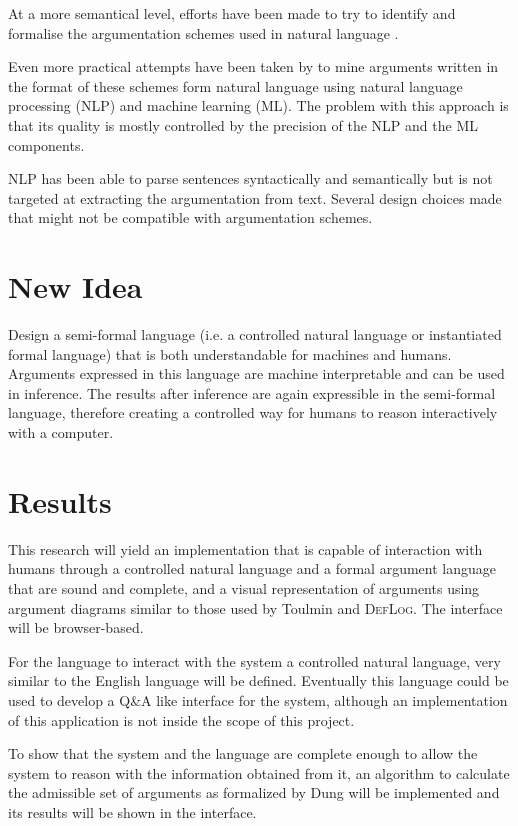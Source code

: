 \documentclass[a4paper]{article}
\begin{document}
At a more semantical level, efforts have been made to try to identify and formalise the argumentation schemes used in natural language \cite{Walton:2013argumentation}.

Even more practical attempts have been taken by  to mine arguments written in the format of these schemes form natural language using natural language processing (NLP) and machine learning (ML). The problem with this approach is that its quality is mostly controlled by the precision of the NLP and the ML components.

NLP has been able to parse sentences syntactically and semantically \cite{Curran:2007vq} but is not targeted at extracting the argumentation from text. Several design choices made that might not be compatible with argumentation schemes.

\section*{New Idea}
Design a semi-formal language (i.e. a controlled natural language or instantiated formal language) that is both understandable for machines and humans. Arguments expressed in this language are machine interpretable and can be used in inference. The results after inference are again expressible in the semi-formal language, therefore creating a controlled way for humans to reason interactively with a computer.

\section*{Results}
This research will yield an implementation that is capable of interaction with humans through a controlled natural language and a formal argument language that are sound and complete, and a visual representation of arguments using argument diagrams similar to those used by Toulmin and \textsc{DefLog}. The interface will be browser-based.

For the language to interact with the system a controlled natural language, very similar to the English language will be defined. Eventually this language could be used to develop a Q\&A like interface for the system, although an implementation of this application is not inside the scope of this project.

To show that the system and the language are complete enough to allow the system to reason with the information obtained from it, an algorithm to calculate the admissible set of arguments as formalized by Dung will be implemented and its results will be shown in the interface. 
\end{document}
